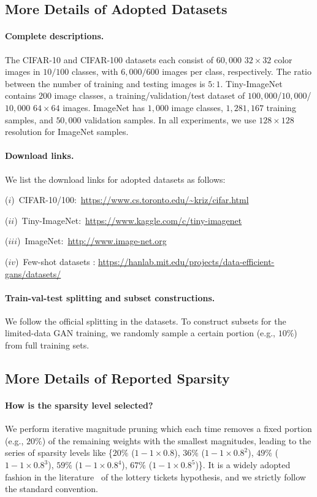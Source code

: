 \documentclass{article}
\begin{document}
\subsection{More Details of Adopted Datasets}
\paragraph{Complete descriptions.} The CIFAR-10 and CIFAR-100 datasets each consist of $60,000$ $32\times32$ color images in $10/100$ classes, with $6,000/600$ images per class, respectively. The ratio between the number of training and testing images is $5:1$. Tiny-ImageNet contains $200$ image classes, a training/validation/test dataset of $100,000$/$10,000$/$10,000$ $64\times64$ images. ImageNet has $1,000$ image classes, $1,281,167$ training samples, and $50,000$ validation samples. In all experiments, we use $128\times128$ resolution for ImageNet samples.

\paragraph{Download links.} We list the download links for adopted datasets as follows:

($i$)~CIFAR-10/100:~\url{https://www.cs.toronto.edu/~kriz/cifar.html}

($ii$)~Tiny-ImageNet:~\url{https://www.kaggle.com/c/tiny-imagenet}

($iii$)~ImageNet:~\url{http://www.image-net.org}

($iv$)~Few-shot datasets \cite{zhao2020diffaugment}: \url{https://hanlab.mit.edu/projects/data-efficient-gans/datasets/}

\paragraph{Train-val-test splitting and subset constructions.} We follow the official splitting in the datasets. To construct subsets for the limited-data GAN training, we randomly sample a certain portion (e.g., $10\%$) from full training sets.

\subsection{More Details of Reported Sparsity}

\paragraph{How is the sparsity level selected?} We perform iterative magnitude pruning which each time removes a fixed portion (e.g., $20\%$) of the remaining weights with the smallest magnitudes, leading to the series of sparsity levels like \{$20\%$ ($1-1\times0.8$), $36\%$ ($1-1\times0.8^2$), $49\%$ ($1-1\times0.8^3$), $59\%$ ($1-1\times0.8^4$), $67\%$ ($1-1\times0.8^5$)\}. It is a widely adopted fashion in the literature~\citep{Frankle:2019vz,chen2021gans} of the lottery tickets hypothesis, and we strictly follow the standard convention.   
\end{document}
